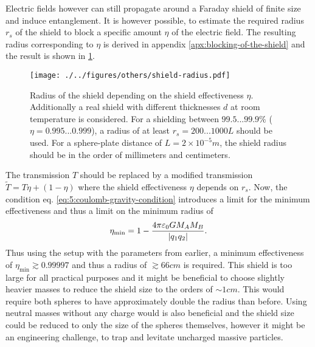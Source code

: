 Electric fields however can still propagate around a Faraday shield of finite size and induce entanglement. It is however possible, to estimate the required radius $r_s$ of the shield to block a specific amount $\eta$ of the electric field.
The resulting radius corresponding to $\eta$ is derived in appendix \ref{apx:blocking-of-the-shield} and the result is shown in \cref{fig:5:shield-radius}.
\begin{figure}[!ht]
  \centering
  \texttt{[image: ./../figures/others/shield-radius.pdf]}
  \caption{Radius of the shield depending on the shield effectiveness $\eta$. Additionally a real shield with different thicknesses $d$ at room temperature is considered. For a shielding between $99.5...99.9\%$ ($\eta = 0.995...0.999$), a radius of at least $r_s =200...1000L$ should be used. For a sphere-plate distance of $L=2 \times 10^{-5}\si{m}$, the shield radius should be in the order of millimeters and centimeters.}
  \label{fig:5:shield-radius}
\end{figure}
The transmission $T$ should be replaced by a modified transmission $\tilde{T} = T\eta + (1-\eta)$ where the shield effectiveness $\eta$ depends on $r_s$. 
Now, the condition eq. \eqref{eq:5:coulomb-gravity-condition} introduces a limit for the minimum effectiveness and thus a limit on the minimum radius of
\begin{equation}
  \eta_\mathrm{min} = 1 - \frac{4\pi \varepsilon_0 G M_A M_B}{\left\lvert q_1 q_2\right\rvert} .
\end{equation}
Thus using the setup with the parameters from earlier, a minimum effectiveness of $\eta_\mathrm{min} \gtrsim 0.99997$ and thus a radius of $\gtrsim 66\si{cm}$ is required.
This shield is too large for all practical purposes and it might be beneficial to choose slightly heavier masses to reduce the shield size to the orders of $\sim 1\si{cm}$. This would require both spheres to have approximately double the radius than before.
Using neutral masses without any charge would is also beneficial and the shield size could be reduced to only the size of the spheres themselves, however it might be an engineering challenge, to trap and levitate uncharged massive particles.





